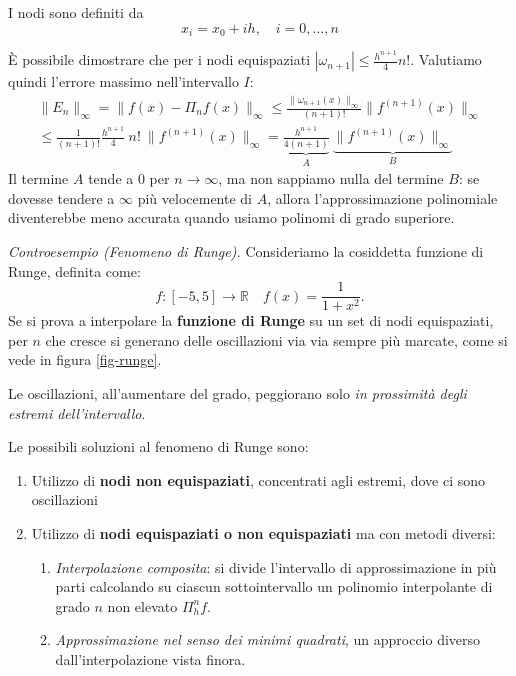 I nodi sono definiti da 
\begin{equation*}
    x_{i}=x_0+ih,\quad i=0,\dots,n
\end{equation*}

È possibile dimostrare che per i nodi equispaziati $|\omega_{n+1}|\le \frac{h^{n+1}} 4 n!$. Valutiamo quindi l'errore massimo nell'intervallo $I$:
\begin{multline*}
    \|E_n\|_\infty=\|f(x)-\Pi_n f(x)\|_\infty \le \frac{\|\omega_{n+1}(x)\|_\infty}{(n+1)!}\| f^{(n+1)}(x) \|_\infty\\
    \le   \frac{1}{(n+1)!} \frac{h^{n+1}}{4}\ n!\ \| \!f^{(n+1)}(x) \|_\infty
    =\underbrace{\frac{h^{n+1}}{4(n+1)}}_A \ \underbrace{\| \!f^{(n+1)}(x) \|_\infty}_B
\end{multline*}
Il termine $A$ tende a $0$ per $n\to\infty$, ma non sappiamo nulla del termine $B$: se dovesse tendere a $\infty$ più velocemente di $A$, allora l'approssimazione polinomiale diventerebbe meno accurata quando usiamo polinomi di grado superiore.

\textit{Controesempio (Fenomeno di Runge).}
Consideriamo la cosiddetta funzione di Runge, definita come:
\begin{equation*}
f:[ -5,5]\rightarrow \mathbb{R} \quad f(x) =\frac{1}{1+x^{2}}.
\end{equation*}
Se si prova a interpolare la \textbf{funzione di Runge} su un set di nodi equispaziati, per $n$ che cresce si generano delle oscillazioni via via sempre più marcate, come si vede in figura \ref{fig-runge}.


Le oscillazioni, all'aumentare del grado, peggiorano solo \textit{in prossimità degli estremi dell'intervallo}.


 Le possibili soluzioni al fenomeno di Runge sono:
\begin{enumerate}
\item Utilizzo di \textbf{nodi non equispaziati}, concentrati agli estremi, dove ci sono oscillazioni
\item Utilizzo di \textbf{nodi equispaziati o non equispaziati} ma con metodi diversi:
\begin{enumerate}
\item \textit{Interpolazione composita}: si divide l'intervallo di approssimazione in più parti calcolando su ciascun sottointervallo un polinomio interpolante di grado $n$ non elevato $\Pi ^{n}_{h} f$.
\item \textit{Approssimazione nel senso dei minimi quadrati}, un approccio diverso dall'interpolazione vista finora.
\end{enumerate}
\end{enumerate}
